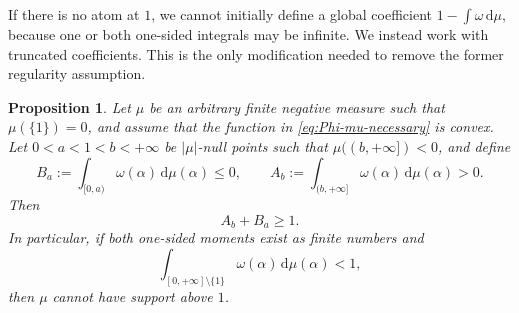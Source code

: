 \documentclass[aps,pra,11pt,onecolumn,nofootinbib,tightenlines]{revtex4-2}
\newtheorem{proposition}[theorem]{Proposition}
\theoremstyle{definition}
\begin{document}
If there is no atom at $1$, we cannot initially define a global coefficient
$1-\int\omega\,\mathrm d\mu$, because one or both one-sided integrals may be infinite. We instead work with truncated coefficients. This is the only modification needed to remove the former regularity assumption.

\begin{proposition}
\label{prop:negative-truncated-moment}
Let $\mu$ be an arbitrary finite negative measure such that $\mu(\{1\})=0$, and assume that the function in \eqref{eq:Phi-mu-necessary} is convex. Let $0<a<1<b<+\infty$ be $|\mu|$-null points such that $\mu((b,+\infty])<0$, and define
\begin{equation}
 B_a:=\int_{[0,a)}\omega(\alpha)\,\mathrm d\mu(\alpha)\leq0,
 \qquad
 A_b:=\int_{(b,+\infty]}\omega(\alpha)\,\mathrm d\mu(\alpha)>0.
 \label{eq:negative-truncated-coefficients}
\end{equation}
Then
\begin{equation}
 A_b+B_a\geq1.
 \label{eq:negative-truncated-inequality}
\end{equation}
In particular, if both one-sided moments exist as finite numbers and
\begin{equation}
 \int_{[0,+\infty]\setminus\{1\}}
 \omega(\alpha)\,\mathrm d\mu(\alpha)<1,
 \label{eq:negative-global-less-than-one}
\end{equation}
then $\mu$ cannot have support above $1$.
\end{proposition}
\end{document}
